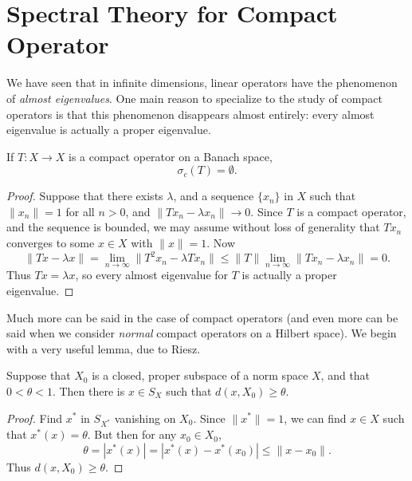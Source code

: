 \section{Spectral Theory for Compact Operator}

We have seen that in infinite dimensions, linear operators have the phenomenon of \emph{almost eigenvalues}. One main reason to specialize to the study of compact operators is that this phenomenon disappears almost entirely: every almost eigenvalue is actually a proper eigenvalue.

\begin{lemma}
    If $T: X \to X$ is a compact operator on a Banach space,
    \[ \sigma_c(T) = \emptyset. \]
\end{lemma}
\begin{proof}
    Suppose that there exists $\lambda$, and a sequence $\{ x_n \}$ in $X$ such that $\| x_n \| = 1$ for all $n > 0$, and $\| Tx_n - \lambda x_n \| \to 0$. Since $T$ is a compact operator, and the sequence is bounded, we may assume without loss of generality that $Tx_n$ converges to some $x \in X$ with $\| x \| = 1$. Now
    \[ \| Tx - \lambda x \| = \lim_{n \to \infty} \| T^2 x_n - \lambda T x_n \| \leq \| T \| \lim_{n \to \infty} \| Tx_n - \lambda x_n \| = 0. \]
    Thus $Tx = \lambda x$, so every almost eigenvalue for $T$ is actually a proper eigenvalue.
\end{proof}

Much more can be said in the case of compact operators (and even more can be said when we consider \emph{normal} compact operators on a Hilbert space). We begin with a very useful lemma, due to Riesz.

\begin{lemma}
    Suppose that $X_0$ is a closed, proper subspace of a norm space $X$, and that $0 < \theta < 1$. Then there is $x \in S_X$ such that $d(x,X_0) \geq \theta$.
\end{lemma}
\begin{proof}
    Find $x^*$ in $S_{X^*}$ vanishing on $X_0$. Since $\| x^* \| = 1$, we can find $x \in X$ such that $x^*(x) = \theta$. But then for any $x_0 \in X_0$,
    \[ \theta = |x^*(x)| = |x^*(x) - x^*(x_0)| \leq \| x - x_0 \|. \]
    Thus $d(x,X_0) \geq \theta$.
\end{proof}

